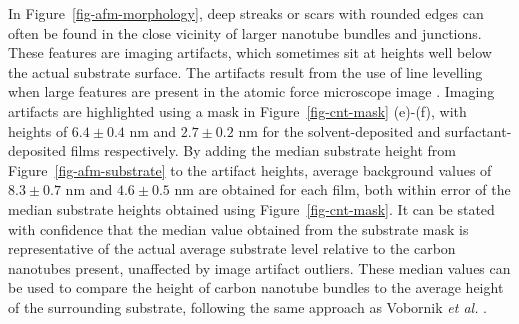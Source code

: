 \documentclass[
  a4paper,
]{scrbook}
\begin{document}
In Figure~\ref{fig-afm-morphology}, deep streaks or scars with rounded
edges can often be found in the close vicinity of larger nanotube
bundles and junctions. These features are imaging artifacts, which
sometimes sit at heights well below the actual substrate surface. The
artifacts result from the use of line levelling when large features are
present in the atomic force microscope image \autocite{Sinha2009}.
Imaging artifacts are highlighted using a mask in
Figure~\ref{fig-cnt-mask} (e)-(f), with heights of \(6.4 \pm 0.4\) nm
and \(2.7 \pm 0.2\) nm for the solvent-deposited and
surfactant-deposited films respectively. By adding the median substrate
height from Figure~\ref{fig-afm-substrate} to the artifact heights,
average background values of \(8.3 \pm 0.7\) nm and \(4.6 \pm 0.5\) nm
are obtained for each film, both within error of the median substrate
heights obtained using Figure~\ref{fig-cnt-mask}. It can be stated with
confidence that the median value obtained from the substrate mask is
representative of the actual average substrate level relative to the
carbon nanotubes present, unaffected by image artifact outliers. These
median values can be used to compare the height of carbon nanotube
bundles to the average height of the surrounding substrate, following
the same approach as Vobornik \emph{et al.} \autocite{Vobornik2023}.
\end{document}
